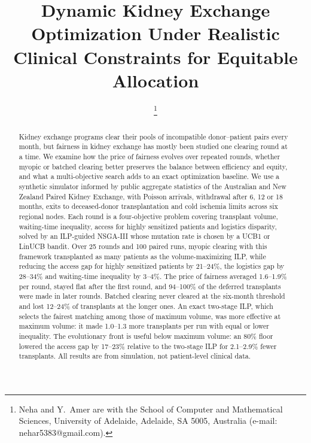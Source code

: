 \documentclass[journal]{IEEEtran}
\begin{document}
\title{Dynamic Kidney Exchange Optimization Under Realistic
Clinical Constraints for Equitable Allocation}

\author{%
\thanks{Neha and Y.~Amer are with the School of Computer and
Mathematical Sciences, University of Adelaide, Adelaide, SA 5005,
Australia (e-mail: nehar5383@gmail.com). }}

\maketitle
\begin{abstract}
Kidney exchange programs clear their pools of incompatible
donor--patient pairs every month, but fairness in kidney exchange has
mostly been studied one clearing round at a time. We examine how the
price of fairness evolves over repeated rounds, whether myopic or
batched clearing better preserves the balance between efficiency and
equity, and what a multi-objective search adds to an exact
optimization baseline. We use a synthetic simulator informed by public
aggregate statistics of the Australian and New Zealand Paired Kidney
Exchange, with Poisson arrivals, withdrawal after 6, 12 or 18 months,
exits to deceased-donor transplantation and cold ischemia limits
across six regional nodes. Each round is a four-objective problem
covering transplant volume, waiting-time inequality, access for highly
sensitized patients and logistics disparity, solved by an ILP-guided
NSGA-III whose mutation rate is chosen by a UCB1 or LinUCB bandit.
Over 25 rounds and 100 paired runs, myopic clearing with this
framework transplanted as many patients as the volume-maximizing ILP,
while reducing the access gap for highly sensitized patients by
21--24\%, the logistics gap by 28--34\% and waiting-time inequality by
3--4\%. The price of fairness averaged 1.6--1.9\% per round, stayed
flat after the first round, and 94--100\% of the deferred transplants
were made in later rounds. Batched clearing never cleared at the
six-month threshold and lost 12--24\% of transplants at the longer
ones. An exact two-stage ILP, which selects the fairest matching among
those of maximum volume, was more effective at maximum volume: it made
1.0--1.3 more transplants per run with equal or lower inequality. The
evolutionary front is useful below maximum volume: an 80\% floor
lowered the access gap by 17--23\% relative to the two-stage ILP for
2.1--2.9\% fewer transplants. All results are from simulation, not
patient-level clinical data.
\end{abstract}
\end{document}
